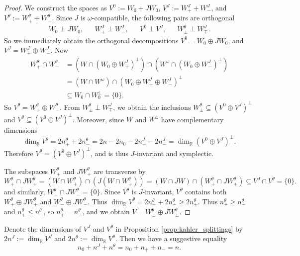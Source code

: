 \documentclass[12pt, final]{article}
\def\R{\mathbb{R}}
\begin{document}
\begin{proof}
We construct the spaces as $V^0 := W_0 + JW_0$, $V^J := W_+^J + W_-^J$, and $V^\theta := W_+^\theta + W_-^\theta$.
Since $J$ is $\omega$-compatible, the following pairs are orthogonal
\begin{align*} W_0 \perp JW_0, && W_+^J\perp W_-^J, &&V^0 \perp V^J, && W_\pm^\theta \perp W_{\mp}^J.\end{align*}
So we immediately obtain the orthogonal decompositions $V^0 = W_0 \oplus JW_0$, and $V^J = W_+^J \oplus W_-^J$.
Now
\begin{align*}
W_+^\theta \cap W_-^\theta &= (W \cap (W_0 \oplus W_+^J)^\perp) \cap (W^\omega \cap (W_0 \oplus W_-^J)^\perp)\\
&= (W \cap W^\omega) \cap (W_0 \oplus W_+^J \oplus W_-^J)^\perp\\
&\subseteq W_0 \cap W_0^\perp = \{0\}.
\end{align*}
So $V^\theta = W_+^\theta \oplus W_-^\theta$. From $W_\pm^\theta \perp W_{\mp}^J$, we obtain the inclusions $W_\pm^\theta \subseteq (V^0 \oplus V^J)^\perp$ and $V^\theta \subseteq (V^0 \oplus V^J)^\perp$. Moreover, since $W$ and $W^\omega$ have complementary dimensions
\[ \dim_\R V^\theta = 2n_+^\theta + 2n_-^\theta = 2n - 2n_0 - 2n_+^J - 2n_-^J = \dim_\R(V^0 \oplus V^J)^\perp.\]
Therefore $V^\theta = (V^0 \oplus V^J)^\perp$, and is thus $J$-invariant and symplectic.

The subspaces $W_+^\theta$ and $JW_+^\theta$ are transverse by
\[ W_+^\theta \cap JW_+^\theta = (W \cap W_+^\theta) \cap (J(W \cap W_+^\theta)) = (W \cap JW) \cap (W_+^\theta \cap J W_+^\theta) \subseteq V^J \cap V^\theta = \{0\}.\]
and similarly, $W_-^\theta \cap JW_-^\theta = \{0\}$. Since $V^\theta$ is $J$-invariant, $V^\theta$ contains both $W_+^\theta \oplus JW_+^\theta$ and $W_-^\theta \oplus JW_-^\theta$.
Thus $\dim _\R V^\theta = 2n_+^\theta + 2n_-^\theta \ge 2n_\pm^\theta$. Thus $n_+^\theta \ge n_-^\theta$ and $n_+^\theta \le n_-^\theta$, so $n_+^\theta = n_-^\theta$, and we obtain $V = W_\pm^\theta \oplus JW_\pm^\theta$.
\end{proof}

Denote the dimensions of $V^J$ and $V^\theta$ in Proposition \ref{prop:kahler_splittings} by $2n^J :=  \dim_\R V^J$ and $2n^\theta :=\dim_\R V^\theta$. Then we have a suggestive equality
\[ n_0 + n^J + n^\theta = n_0 + n_+ + n_- = n.\]
\end{document}
